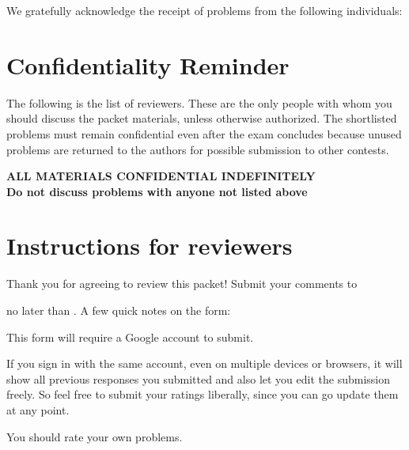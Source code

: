 \maketitle %

We gratefully acknowledge the receipt of \numreceived{}
problems from the following individuals:
\begin{quote}
\large \thankedauthors
\end{quote}

\tableofcontents

\chapter*{Confidentiality Reminder}
The following is the list of reviewers.
These are the only people with whom you should discuss
the packet materials, unless otherwise authorized.
The shortlisted problems must remain confidential
even after the exam concludes because unused problems are returned
to the authors for possible submission to other contests.

\vspace{1em}


\vfill
\begin{mdframed}
	\begin{center}
		\bfseries
		\Large
		{ \color{blue} ALL MATERIALS CONFIDENTIAL INDEFINITELY} \\[1em]
		Do not discuss problems with anyone not listed above
	\end{center}
\end{mdframed}
\vspace{1.5em}

\pagebreak

\chapter{Instructions for reviewers}
Thank you for agreeing to review this packet!
Submit your comments to
\begin{center}
	\submitURL
\end{center}
no later than \alert{\deadline}.
A few quick notes on the form:
\begin{itemize}
\ii This form will require a Google account to submit.

\ii If you sign in with the same account, even on multiple devices
or browsers, it will show all previous responses you submitted
and also let you edit the submission freely.
So feel free to submit your ratings liberally,
since you can go update them at any point.

\ii You should rate your own problems.
\end{itemize}

